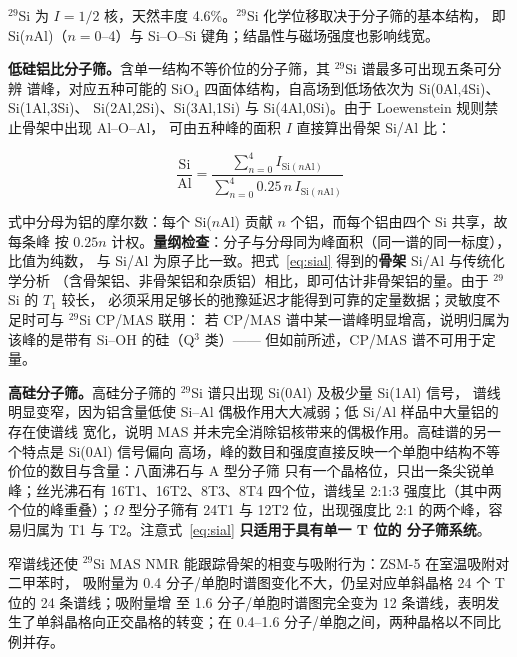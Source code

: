 $^{29}$Si 为 $I=1/2$ 核，天然丰度 4.6\%。$^{29}$Si 化学位移取决于分子筛的基本结构，
即 Si($n$Al)（$n=0$--4）与 Si--O--Si 键角；结晶性与磁场强度也影响线宽。

\textbf{低硅铝比分子筛。}含单一结构不等价位的分子筛，其 $^{29}$Si 谱最多可出现五条可分辨
谱峰，对应五种可能的 SiO$_{4}$ 四面体结构，自高场到低场依次为 Si(0Al,4Si)、Si(1Al,3Si)、
Si(2Al,2Si)、Si(3Al,1Si) 与 Si(4Al,0Si)。由于 Loewenstein 规则禁止骨架中出现 Al--O--Al，
可由五种峰的面积 $I$ 直接算出骨架 Si/Al 比：

\begin{equation}
\label{eq:sial}
\frac{\mathrm{Si}}{\mathrm{Al}}=
\frac{\displaystyle\sum_{n=0}^{4}I_{\mathrm{Si}(n\mathrm{Al})}}
{\displaystyle\sum_{n=0}^{4}0.25\,n\,I_{\mathrm{Si}(n\mathrm{Al})}}
\end{equation}

式中分母为铝的摩尔数：每个 Si($n$Al) 贡献 $n$ 个铝，而每个铝由四个 Si 共享，故每条峰
按 $0.25n$ 计权。\textbf{量纲检查}：分子与分母同为峰面积（同一谱的同一标度），比值为纯数，
与 Si/Al 为原子比一致。把式~\eqref{eq:sial} 得到的\textbf{骨架} Si/Al 与传统化学分析
（含骨架铝、非骨架铝和杂质铝）相比，即可估计非骨架铝的量。由于 $^{29}$Si 的 $T_1$ 较长，
必须采用足够长的弛豫延迟才能得到可靠的定量数据；灵敏度不足时可与 $^{29}$Si CP/MAS 联用：
若 CP/MAS 谱中某一谱峰明显增高，说明归属为该峰的是带有 Si--OH 的硅（Q$^{3}$ 类）——
但如前所述，CP/MAS 谱不可用于定量。

\textbf{高硅分子筛。}高硅分子筛的 $^{29}$Si 谱只出现 Si(0Al) 及极少量 Si(1Al) 信号，
谱线明显变窄，因为铝含量低使 Si--Al 偶极作用大大减弱；低 Si/Al 样品中大量铝的存在使谱线
宽化，说明 MAS 并未完全消除铝核带来的偶极作用。高硅谱的另一个特点是 Si(0Al) 信号偏向
高场，峰的数目和强度直接反映一个单胞中结构不等价位的数目与含量：八面沸石与 A 型分子筛
只有一个晶格位，只出一条尖锐单峰；丝光沸石有 16T1、16T2、8T3、8T4 四个位，谱线呈
2:1:3 强度比（其中两个位的峰重叠）；$\Omega$ 型分子筛有 24T1 与 12T2 位，出现强度比
2:1 的两个峰，容易归属为 T1 与 T2。注意式~\eqref{eq:sial} \textbf{只适用于具有单一 T 位的
分子筛系统}。

窄谱线还使 $^{29}$Si MAS NMR 能跟踪骨架的相变与吸附行为：ZSM-5 在室温吸附对二甲苯时，
吸附量为 0.4 分子/单胞时谱图变化不大，仍呈对应单斜晶格 24 个 T 位的 24 条谱线；吸附量增
至 1.6 分子/单胞时谱图完全变为 12 条谱线，表明发生了单斜晶格向正交晶格的转变；在 0.4--1.6
分子/单胞之间，两种晶格以不同比例并存。

